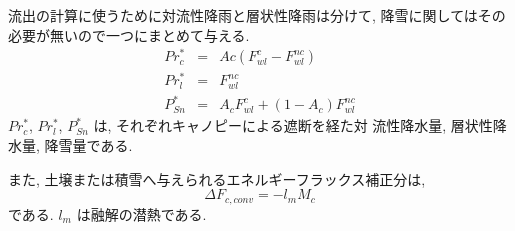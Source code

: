 流出の計算に使うために対流性降雨と層状性降雨は分けて, 降雪に関してはその
必要が無いので一つにまとめて与える.
\begin{eqnarray}
 Pr_c^* &=& Ac ( F_{wl}^{c} - F_{wl}^{nc} ) \\
 Pr_l^* &=& F_{wl}^{nc} \\
 P_{Sn}^* &=& A_c F_{wl}^{c} + (1-A_c) F_{wl}^{nc}
\end{eqnarray}
$Pr_c^*$, $Pr_l^*$, $P_{Sn}^*$ は, それぞれキャノピーによる遮断を経た対
流性降水量, 層状性降水量, 降雪量である.

また, 土壌または積雪へ与えられるエネルギーフラックス補正分は,
\begin{equation}
 \Delta F_{c,conv} = - l_m M_c
\end{equation}
である. $l_m$ は融解の潜熱である.
